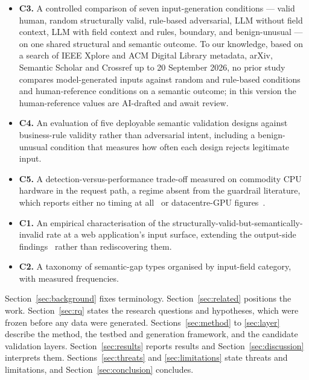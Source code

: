 \documentclass[conference]{IEEEtran}
\begin{document}
\begin{itemize}
  \item \textbf{C3.} A controlled comparison of seven input-generation conditions --- valid human,
  random structurally valid, rule-based adversarial, LLM without field context, LLM with field
  context and rules, boundary, and benign-unusual --- on one shared structural and semantic outcome.
  To our knowledge, based on a search of IEEE Xplore and ACM Digital Library metadata, arXiv,
  Semantic Scholar and Crossref up to 20 September 2026, no prior study compares model-generated
  inputs against random and rule-based conditions and human-reference conditions on a semantic
  outcome; in this version the human-reference values are AI-drafted and await review.
  \item \textbf{C4.} An evaluation of five deployable semantic validation designs against business-rule
  validity rather than adversarial intent, including a benign-unusual condition that measures how
  often each design rejects legitimate input.
  \item \textbf{C5.} A detection-versus-performance trade-off measured on commodity CPU hardware in
  the request path, a regime absent from the guardrail literature, which reports either no timing at
  all~\cite{jacob2025promptshield} or datacentre-GPU figures~\cite{ahmed2026reflexguard,saleem2026layered,wang2026sokguardrails}.
  \item \textbf{C1.} An empirical characterisation of the structurally-valid-but-semantically-invalid
  rate at a web application's input surface, extending the output-side
  findings~\cite{li2026orderbench,ray2026constrainttax,singh2026sob,wrenn2026enterprise} rather than
  rediscovering them.
  \item \textbf{C2.} A taxonomy of semantic-gap types organised by input-field category, with
  measured frequencies.
\end{itemize}

Section~\ref{sec:background} fixes terminology. Section~\ref{sec:related} positions the work.
Section~\ref{sec:rq} states the research questions and hypotheses, which were frozen before any data
were generated. Sections~\ref{sec:method} to \ref{sec:layer} describe the method, the testbed and
generation framework, and the candidate validation layers. Section~\ref{sec:results} reports results
and Section~\ref{sec:discussion} interprets them. Sections~\ref{sec:threats} and
\ref{sec:limitations} state threats and limitations, and Section~\ref{sec:conclusion} concludes.
\end{document}
